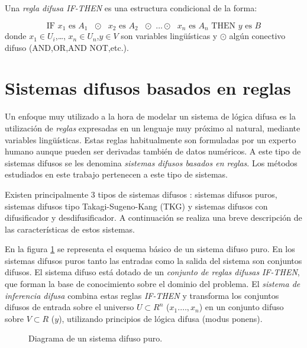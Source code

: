 \begin{definition}
Una \emph{regla difusa IF-THEN} es una estructura condicional de la forma:

\begin{equation}
\text{IF $x_{1}$ es $A_{1}$ $\odot$ $x_{2}$ es $A_{2}$ $\odot$ \ldots $\odot$ $x_{n}$ es $A_{n}$ THEN $y$ es $B$}
\end{equation}
donde $x_{1} \in U_{i}$,\ldots, $x_{n} \in U_{n}$,$y \in V$ son variables lingüísticas y $\odot$ algún conectivo difuso (AND,OR,AND NOT,etc.).
\end{definition}

\section{Sistemas difusos basados en reglas}\label{sec:sistemas-difusos-basados-en-reglas}
Un enfoque muy utilizado a la hora de modelar un sistema de lógica difusa es la utilización de \emph{reglas} expresadas en un lenguaje muy próximo al natural, mediante variables lingüísticas. Estas reglas habitualmente son formuladas por un experto humano aunque pueden ser derivadas también de datos numéricos. A este tipo de sistemas difusos se les denomina \emph{sistemas difusos basados en reglas}. Los métodos estudiados en este trabajo pertenecen a este tipo de sistemas.

Existen principalmente 3 tipos de sistemas difusos \cite{wang1997}: sistemas difusos puros, sistemas difusos tipo Takagi-Sugeno-Kang (TKG) y sistemas difusos con difusificador y desdifusificador. A continuación se realiza una breve descripción de las características de estos sistemas.

En la figura \ref{fig:pure-fuzzy-system} se representa el esquema básico de un sistema difuso puro. En los sistemas difusos puros tanto las entradas como la salida del sistema son conjuntos difusos. El sistema difuso está dotado de un \emph{conjunto de reglas difusas} \emph{IF-THEN}, que forman la base de conocimiento sobre el dominio del problema. El \emph{sistema de inferencia difusa} combina estas reglas \emph{IF-THEN} y transforma los conjuntos difusos de entrada sobre el universo $U \subset R^{n}$ ($x_{1}.\ldots,x_{n}$) en un conjunto difuso sobre $V \subset R$ ($y$), utilizando principios de lógica difusa (modus ponens).

\begin{figure}[tb]
	\centering
	
	\caption{Diagrama de un sistema difuso puro.}
	\label{fig:pure-fuzzy-system}
\end{figure}


